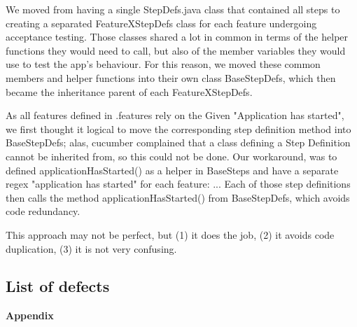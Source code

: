 \documentclass[11pt]{article}
\begin{document}

We moved from having a single StepDefs.java class that contained all steps to creating a separated FeatureXStepDefs class for each feature undergoing acceptance testing. Those classes shared a lot in common in terms of the helper functions they would need to call, but also of the member variables they would use to test the app's behaviour. For this reason, we moved these common members and helper functions into their own class BaseStepDefs, which then became the inheritance parent of each FeatureXStepDefs. 

As all features defined in .features rely on the Given "Application has started", we first thought it logical to move the corresponding step definition method into BaseStepDefs; alas, cucumber complained that a class defining a Step Definition cannot be inherited from, so this could not be done. Our workaround, was to defined applicationHasStarted() as a helper in BaseSteps and have a separate regex "application has started" for each feature:
... 
Each of those step definitions then calls the method applicationHasStarted() from BaseStepDefs, which avoids code redundancy. 

This approach may not be perfect, but (1) it does the job, (2) it avoids code duplication, (3) it is not very confusing. 


\subsection{List of defects}




\appendix

\setcounter{section}{0}
\pagebreak 
\clearpage
\thispagestyle{empty} %
\vspace*{9cm}
\begin{center}
{\bf \LARGE Appendix}
\end{center}
\vfill
\pagebreak



\end{document}
